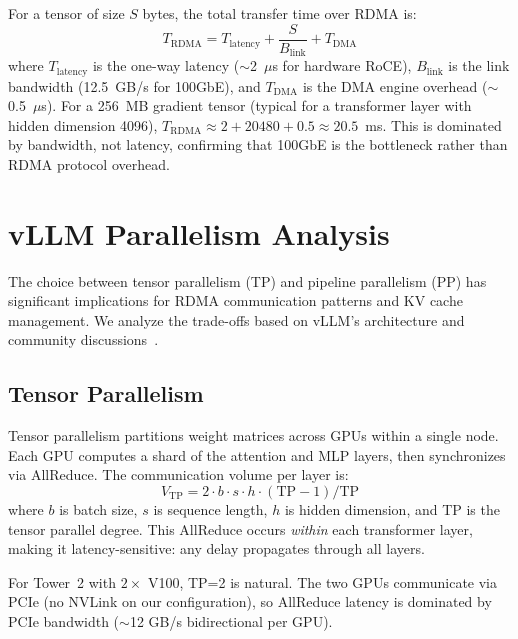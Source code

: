 \documentclass[11pt,letterpaper]{article}
\theoremstyle{definition}
\begin{document}
For a tensor of size $S$ bytes, the total transfer time over RDMA is:
\begin{equation}
    T_{\text{RDMA}} = T_{\text{latency}} + \frac{S}{B_{\text{link}}} + T_{\text{DMA}}
\end{equation}
where $T_{\text{latency}}$ is the one-way latency ($\sim$2~$\mu$s for hardware RoCE), $B_{\text{link}}$ is the link bandwidth (12.5~GB/s for 100GbE), and $T_{\text{DMA}}$ is the DMA engine overhead ($\sim$0.5~$\mu$s). For a 256~MB gradient tensor (typical for a transformer layer with hidden dimension 4096), $T_{\text{RDMA}} \approx 2 + 20480 + 0.5 \approx 20.5$~ms. This is dominated by bandwidth, not latency, confirming that 100GbE is the bottleneck rather than RDMA protocol overhead.

\section{vLLM Parallelism Analysis}
\label{sec:vllm-parallelism}

The choice between tensor parallelism (TP) and pipeline parallelism (PP) has significant implications for RDMA communication patterns and KV cache management. We analyze the trade-offs based on vLLM's architecture and community discussions~\cite{vllm-tp-pp-discussion}.

\subsection{Tensor Parallelism}

Tensor parallelism partitions weight matrices across GPUs within a single node. Each GPU computes a shard of the attention and MLP layers, then synchronizes via AllReduce. The communication volume per layer is:
\begin{equation}
    V_{\text{TP}} = 2 \cdot b \cdot s \cdot h \cdot (\text{TP} - 1) / \text{TP}
\end{equation}
where $b$ is batch size, $s$ is sequence length, $h$ is hidden dimension, and TP is the tensor parallel degree. This AllReduce occurs \emph{within} each transformer layer, making it latency-sensitive: any delay propagates through all layers.

For Tower~2 with $2\times$ V100, TP=2 is natural. The two GPUs communicate via PCIe (no NVLink on our configuration), so AllReduce latency is dominated by PCIe bandwidth ($\sim$12 GB/s bidirectional per GPU).
\end{document}
